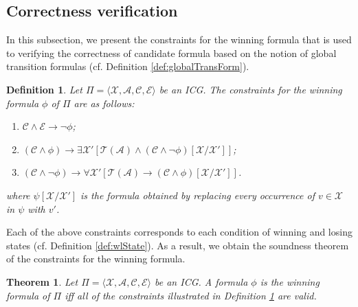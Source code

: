 \documentclass[review]{elsarticle}
\newcommand{\tuple}[1]{\langle {#1} \rangle}
\newcommand{\statevar}{\mathcal{X}}
\newcommand{\act}{\mathcal{A}}
\newcommand{\trans}{\mathcal{T}}
\newcommand{\constraint}{\mathcal{C}}
\newcommand{\estate}{\mathcal{E}}
\newtheorem{definition}{Definition}
\newtheorem{theorem}{Theorem}
\begin{document}
\subsection{Correctness verification} \label{sec:winFormCorVer}
    In this subsection, we present the constraints for the winning formula that is used to verifying the correctness of candidate formula based on the notion of global transition formulas (cf. Definition \ref{def:globalTransForm}).
	

    
    
	\begin{definition}\label{def:consWinForm} \rm
		Let $\Pi = \tuple{\statevar, \act, \constraint, \estate}$ be an ICG.
		The constraints for the winning formula $\phi$ of $\Pi$ are as follows:
		\begin{enumerate}
			\item $\constraint \land \estate \rightarrow \neg \phi$;
			\item $(\constraint \land \phi) \rightarrow \exists \statevar' [\trans(\act) \land (\constraint \land \neg \phi)[\statevar/\statevar']]$;
			\item $(\constraint \land \neg \phi) \rightarrow \forall \statevar' [\trans(\act) \rightarrow (\constraint \land \phi)[\statevar/\statevar']]$.
		\end{enumerate}
		where $\psi[\statevar/\statevar']$ is the formula obtained by replacing every occurrence of $v \in \statevar$ in $\psi$ with $v'$.
	\end{definition}

	Each of the above constraints corresponds to each condition of winning and losing states (cf. Definition \ref{def:wlState}).
	As a result, we obtain the soundness theorem of the constraints for the winning formula.
	\begin{theorem} \label{thm:consWinForm} 
		Let $\Pi = \tuple{\statevar, \act, \constraint, \estate}$ be an ICG.
		A formula $\phi$ is the winning formula of $\Pi$ iff all of the constraints illustrated in Definition \ref{def:consWinForm} are valid.
	\end{theorem}
    
\end{document}
